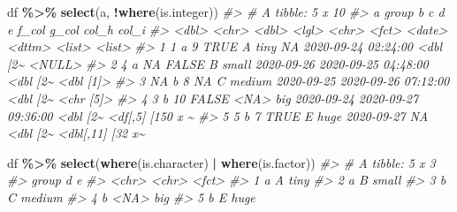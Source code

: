 \documentclass[
]{report}
\newenvironment{Shaded}{\begin{snugshade}}{\end{snugshade}}
\newcommand{\CommentTok}[1]{\textcolor[rgb]{0.56,0.35,0.01}{\textit{#1}}}
\newcommand{\KeywordTok}[1]{\textcolor[rgb]{0.13,0.29,0.53}{\textbf{#1}}}
\newcommand{\NormalTok}[1]{#1}
\newcommand{\OperatorTok}[1]{\textcolor[rgb]{0.81,0.36,0.00}{\textbf{#1}}}
\newcommand{\StringTok}[1]{\textcolor[rgb]{0.31,0.60,0.02}{#1}}
\begin{document}
\begin{Shaded}
\begin{Highlighting}[]
\NormalTok{df }\OperatorTok{\%\textgreater{}\%}
\StringTok{  }\KeywordTok{select}\NormalTok{(a, }\OperatorTok{!}\KeywordTok{where}\NormalTok{(is.integer))}
\CommentTok{\#\textgreater{} \# A tibble: 5 x 10}
\CommentTok{\#\textgreater{}       a group     b c     d     e      f\_col      g\_col               col\_h    col\_i           }
\CommentTok{\#\textgreater{}   \textless{}dbl\textgreater{} \textless{}chr\textgreater{} \textless{}dbl\textgreater{} \textless{}lgl\textgreater{} \textless{}chr\textgreater{} \textless{}fct\textgreater{}  \textless{}date\textgreater{}     \textless{}dttm\textgreater{}              \textless{}list\textgreater{}   \textless{}list\textgreater{}          }
\CommentTok{\#\textgreater{} 1     1 a         9 TRUE  A     tiny   NA         2020{-}09{-}24 02:24:00 \textless{}dbl [2\textasciitilde{} \textless{}NULL\textgreater{}          }
\CommentTok{\#\textgreater{} 2     4 a        NA FALSE B     small  2020{-}09{-}26 2020{-}09{-}25 04:48:00 \textless{}dbl [2\textasciitilde{} \textless{}dbl [1]\textgreater{}       }
\CommentTok{\#\textgreater{} 3    NA b         8 NA    C     medium 2020{-}09{-}25 2020{-}09{-}26 07:12:00 \textless{}dbl [2\textasciitilde{} \textless{}chr [5]\textgreater{}       }
\CommentTok{\#\textgreater{} 4     3 b        10 FALSE \textless{}NA\textgreater{}  big    2020{-}09{-}24 2020{-}09{-}27 09:36:00 \textless{}dbl [2\textasciitilde{} \textless{}df[,5] [150 x \textasciitilde{}}
\CommentTok{\#\textgreater{} 5     5 b         7 TRUE  E     huge   2020{-}09{-}27 NA                  \textless{}dbl [2\textasciitilde{} \textless{}dbl[,11] [32 x\textasciitilde{}}
\end{Highlighting}
\end{Shaded}

\begin{Shaded}
\begin{Highlighting}[]
\NormalTok{df }\OperatorTok{\%\textgreater{}\%}
\StringTok{  }\KeywordTok{select}\NormalTok{(}\KeywordTok{where}\NormalTok{(is.character) }\OperatorTok{|}\StringTok{ }\KeywordTok{where}\NormalTok{(is.factor))}
\CommentTok{\#\textgreater{} \# A tibble: 5 x 3}
\CommentTok{\#\textgreater{}   group d     e     }
\CommentTok{\#\textgreater{}   \textless{}chr\textgreater{} \textless{}chr\textgreater{} \textless{}fct\textgreater{} }
\CommentTok{\#\textgreater{} 1 a     A     tiny  }
\CommentTok{\#\textgreater{} 2 a     B     small }
\CommentTok{\#\textgreater{} 3 b     C     medium}
\CommentTok{\#\textgreater{} 4 b     \textless{}NA\textgreater{}  big   }
\CommentTok{\#\textgreater{} 5 b     E     huge}
\end{Highlighting}
\end{Shaded}
\end{document}
